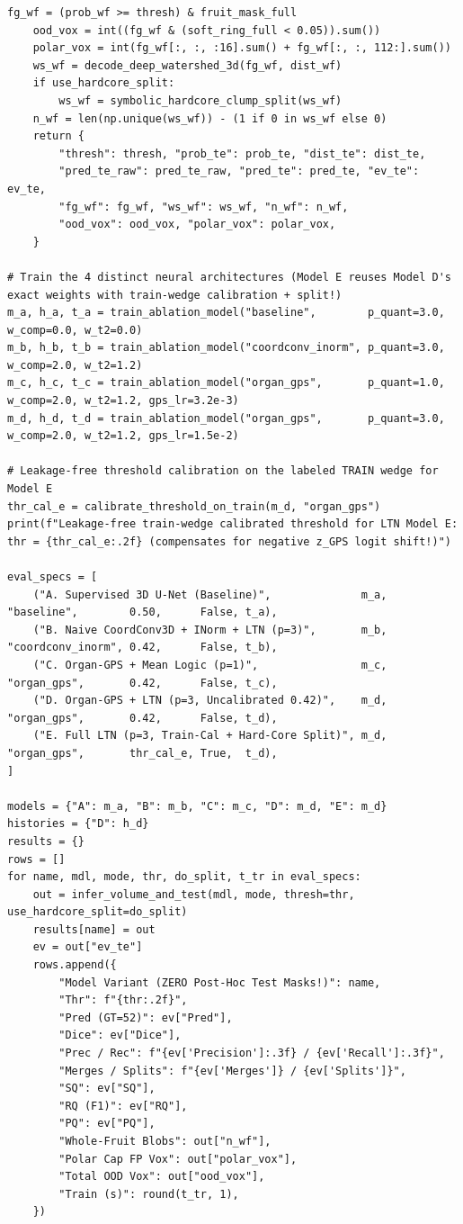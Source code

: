 \documentclass[10pt,a4paper]{article}
\begin{document}
\begin{codebox}[{In [4] $\cdot$ Python --- Step 4 -- Controlled 5-model ablation study (SSL warm-start, Organ-GPS, p=1 vs p=3, calibration)}]
\begin{lstlisting}[style=pybmed]
    fg_wf = (prob_wf >= thresh) & fruit_mask_full
    ood_vox = int((fg_wf & (soft_ring_full < 0.05)).sum())
    polar_vox = int(fg_wf[:, :, :16].sum() + fg_wf[:, :, 112:].sum())
    ws_wf = decode_deep_watershed_3d(fg_wf, dist_wf)
    if use_hardcore_split:
        ws_wf = symbolic_hardcore_clump_split(ws_wf)
    n_wf = len(np.unique(ws_wf)) - (1 if 0 in ws_wf else 0)
    return {
        "thresh": thresh, "prob_te": prob_te, "dist_te": dist_te,
        "pred_te_raw": pred_te_raw, "pred_te": pred_te, "ev_te": ev_te,
        "fg_wf": fg_wf, "ws_wf": ws_wf, "n_wf": n_wf,
        "ood_vox": ood_vox, "polar_vox": polar_vox,
    }

# Train the 4 distinct neural architectures (Model E reuses Model D's exact weights with train-wedge calibration + split!)
m_a, h_a, t_a = train_ablation_model("baseline",        p_quant=3.0, w_comp=0.0, w_t2=0.0)
m_b, h_b, t_b = train_ablation_model("coordconv_inorm", p_quant=3.0, w_comp=2.0, w_t2=1.2)
m_c, h_c, t_c = train_ablation_model("organ_gps",       p_quant=1.0, w_comp=2.0, w_t2=1.2, gps_lr=3.2e-3)
m_d, h_d, t_d = train_ablation_model("organ_gps",       p_quant=3.0, w_comp=2.0, w_t2=1.2, gps_lr=1.5e-2)

# Leakage-free threshold calibration on the labeled TRAIN wedge for Model E
thr_cal_e = calibrate_threshold_on_train(m_d, "organ_gps")
print(f"Leakage-free train-wedge calibrated threshold for LTN Model E: thr = {thr_cal_e:.2f} (compensates for negative z_GPS logit shift!)")

eval_specs = [
    ("A. Supervised 3D U-Net (Baseline)",              m_a, "baseline",        0.50,      False, t_a),
    ("B. Naive CoordConv3D + INorm + LTN (p=3)",       m_b, "coordconv_inorm", 0.42,      False, t_b),
    ("C. Organ-GPS + Mean Logic (p=1)",                m_c, "organ_gps",       0.42,      False, t_c),
    ("D. Organ-GPS + LTN (p=3, Uncalibrated 0.42)",    m_d, "organ_gps",       0.42,      False, t_d),
    ("E. Full LTN (p=3, Train-Cal + Hard-Core Split)", m_d, "organ_gps",       thr_cal_e, True,  t_d),
]

models = {"A": m_a, "B": m_b, "C": m_c, "D": m_d, "E": m_d}
histories = {"D": h_d}
results = {}
rows = []
for name, mdl, mode, thr, do_split, t_tr in eval_specs:
    out = infer_volume_and_test(mdl, mode, thresh=thr, use_hardcore_split=do_split)
    results[name] = out
    ev = out["ev_te"]
    rows.append({
        "Model Variant (ZERO Post-Hoc Test Masks!)": name,
        "Thr": f"{thr:.2f}",
        "Pred (GT=52)": ev["Pred"],
        "Dice": ev["Dice"],
        "Prec / Rec": f"{ev['Precision']:.3f} / {ev['Recall']:.3f}",
        "Merges / Splits": f"{ev['Merges']} / {ev['Splits']}",
        "SQ": ev["SQ"],
        "RQ (F1)": ev["RQ"],
        "PQ": ev["PQ"],
        "Whole-Fruit Blobs": out["n_wf"],
        "Polar Cap FP Vox": out["polar_vox"],
        "Total OOD Vox": out["ood_vox"],
        "Train (s)": round(t_tr, 1),
    })


\end{lstlisting}
\end{codebox}
\end{document}

